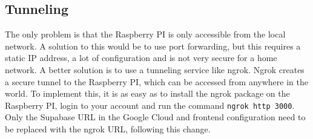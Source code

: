 \subsection{Tunneling}
The only problem is that the Raspberry PI is only accessible from the local network. A solution to this would be to use port forwarding, but this requires a static IP address, a lot of configuration and is not very secure for a home network. A better solution is to use a tunneling service like ngrok. Ngrok creates a secure tunnel to the Raspberry PI, which can be accessed from anywhere in the world.
To implement this, it is as easy as to install the ngrok package on the Raspberry PI, login to your account and run the command \texttt{ngrok http 3000}. Only the Supabase URL in the Google Cloud and frontend configuration need to be replaced with the ngrok URL, following this change.
